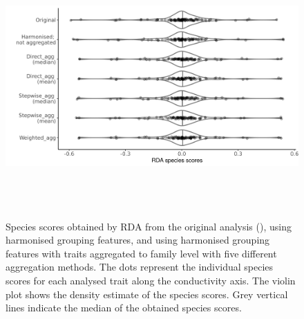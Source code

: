 \documentclass[12pt]{article}
\begin{document}
\begin{figure}[H]
  \centering
  \includegraphics[width=16.5cm, height=10cm]{Species_scores_rda.png}
  \caption{Species scores obtained by RDA from the original analysis (\cite{szocs_effects_2014}), using harmonised grouping features, and using harmonised grouping features with traits aggregated to family level with five different aggregation methods. The dots represent the individual species scores for each analysed trait along the conductivity axis. The violin plot shows the density estimate of the species scores. Grey vertical lines indicate the median of the obtained species scores.}
  \label{fig:violin_plot_species_sc}
\end{figure}
\end{document}
